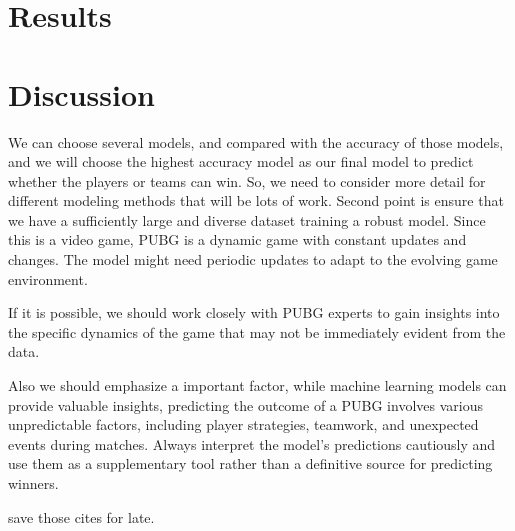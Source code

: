 \documentclass[12pt]{article}
\begin{document}
\section{Results}
\label{sec:resu}







\section{Discussion}
\label{sec:disc}

We can choose several models, and compared with the accuracy of those models, and we will choose the highest accuracy model as our final model to predict whether the players or teams can win. So, we need to consider more detail for different modeling methods that will be lots of work.
Second point is ensure that we have a sufficiently large and diverse dataset training a robust model.
Since this is a video game, PUBG is a dynamic game with constant updates and changes. The model might need periodic updates to adapt to the evolving game environment.

If it is possible, we should work closely with PUBG experts to gain insights into the specific dynamics of the game that may not be immediately evident from the data.

Also we should emphasize a important factor, while machine learning models can provide valuable insights, predicting the outcome of a PUBG  involves various unpredictable factors, including player strategies, teamwork, and unexpected events during matches. Always interpret the model's predictions cautiously and use them as a supplementary tool rather than a definitive source for predicting winners.


\citet{aggarwal2021rank}
\citet{liu2020two}
\citet{ghazali2021esports}

save those cites for late.




\end{document}
